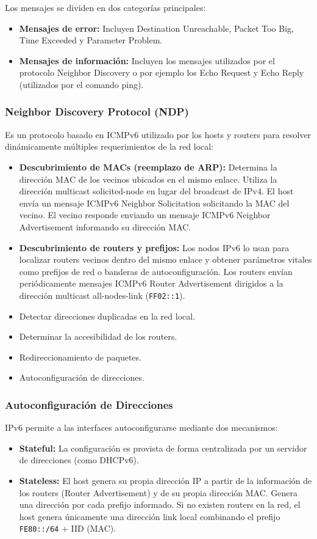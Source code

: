 Los mensajes se dividen en dos categorías principales:
\begin{itemize}
  \item \textbf{Mensajes de error:} Incluyen Destination Unreachable, Packet Too Big, Time Exceeded y Parameter Problem.
  \item \textbf{Mensajes de información:} Incluyen los mensajes utilizados por el protocolo Neighbor Discovery o por ejemplo los Echo Request y Echo Reply (utilizados por el comando ping).
\end{itemize}

\subsubsection{Neighbor Discovery Protocol (NDP)}

Es un protocolo basado en ICMPv6 utilizado por los hosts y routers para resolver dinámicamente múltiples requerimientos de la red local:
\begin{itemize}
  \item \textbf{Descubrimiento de MACs (reemplazo de ARP):} Determina la dirección MAC de los vecinos ubicados en el mismo enlace. Utiliza la dirección multicast solicited-node en lugar del broadcast de IPv4. El host envía un mensaje ICMPv6 Neighbor Solicitation solicitando la MAC del vecino. El vecino responde enviando un mensaje ICMPv6 Neighbor Advertisement informando su dirección MAC.
  \item \textbf{Descubrimiento de routers y prefijos:} Los nodos IPv6 lo usan para localizar routers vecinos dentro del mismo enlace y obtener parámetros vitales como prefijos de red o banderas de autoconfiguración. Los routers envían periódicamente mensajes ICMPv6 Router Advertisement dirigidos a la dirección multicast all-nodes-link (\texttt{FF02::1}).
  \item Detectar direcciones duplicadas en la red local.
  \item Determinar la accesibilidad de los routers.
  \item Redireccionamiento de paquetes.
  \item Autoconfiguración de direcciones.
\end{itemize}

\subsubsection{Autoconfiguración de Direcciones}

IPv6 permite a las interfaces autoconfigurarse mediante dos mecanismos:
\begin{itemize}
  \item \textbf{Stateful:} La configuración es provista de forma centralizada por un servidor de direcciones (como DHCPv6).
  \item \textbf{Stateless:} El host genera su propia dirección IP a partir de la información de los routers (Router Advertisement) y de su propia dirección MAC. Genera una dirección por cada prefijo informado. Si no existen routers en la red, el host genera únicamente una dirección link local combinando el prefijo \texttt{FE80::/64} + IID (MAC).
\end{itemize}

